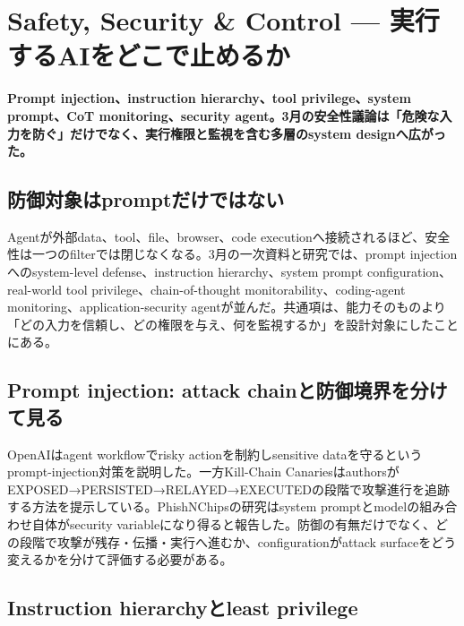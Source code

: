 \section{Safety, Security \& Control — 実行するAIをどこで止めるか}
\noindent\textbf{Prompt injection、instruction hierarchy、tool privilege、system prompt、CoT monitoring、security agent。3月の安全性議論は「危険な入力を防ぐ」だけでなく、実行権限と監視を含む多層のsystem designへ広がった。}\autocite{src-18b7ee4fe5e4,src-3dec299964e6,src-87dacccfecfd,src-b4b340379768}

\subsection{防御対象はpromptだけではない}

Agentが外部data、tool、file、browser、code executionへ接続されるほど、安全性は一つのfilterでは閉じなくなる。3月の一次資料と研究では、prompt injectionへのsystem-level defense、instruction hierarchy、system prompt configuration、real-world tool privilege、chain-of-thought monitorability、coding-agent monitoring、application-security agentが並んだ。共通項は、能力そのものより「どの入力を信頼し、どの権限を与え、何を監視するか」を設計対象にしたことにある。\autocite{src-18b7ee4fe5e4,src-287a6bf67154,src-3dec299964e6,src-549bffaad22c,src-5becf449a527,src-87dacccfecfd,src-b4b340379768,src-e627c8192172}


\subsection{Prompt injection: attack chainと防御境界を分けて見る}

OpenAIはagent workflowでrisky actionを制約しsensitive dataを守るというprompt-injection対策を説明した。一方Kill-Chain CanariesはauthorsがEXPOSED→PERSISTED→RELAYED→EXECUTEDの段階で攻撃進行を追跡する方法を提示している。PhishNChipsの研究はsystem promptとmodelの組み合わせ自体がsecurity variableになり得ると報告した。防御の有無だけでなく、どの段階で攻撃が残存・伝播・実行へ進むか、configurationがattack surfaceをどう変えるかを分けて評価する必要がある。\autocite{src-3dec299964e6,src-87dacccfecfd,src-e627c8192172}


\subsection{Instruction hierarchyとleast privilege}

